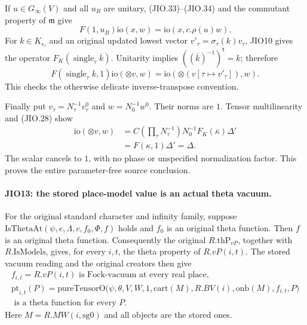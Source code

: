 If \(u\in G_\infty(V)\) and all \(u_B\) are unitary,
(JIO.33)--(JIO.34) and the commutant property of \(\mathfrak m\)
give
\[
                  F(1,u_B)\mathrm{io}(x,w)
                             =\mathrm{io}(x,c.\rho(u)w).
 \tag{JIO.36}
\]
For \(k\in K_{\epsilon_\tau}\) and an original updated lowest
vector \(v'_\tau=\sigma_\tau(k)v_\tau\), JIO10 gives the
operator \(F_K(\operatorname{single}_\tau\overline{k})\).
Unitarity implies
\(((\overline{k})^{-1})^{\mathsf t}=k\); therefore
\[
 F(\operatorname{single}_\tau k,1)\mathrm{io}(\otimes v,w)
                 =\mathrm{io}(\otimes(v[\tau\mapsto v'_\tau]),w).
 \tag{JIO.37}
\]
This checks the otherwise delicate inverse-transpose convention.

Finally put \(v_\tau=N_\tau^{-1}v^0_\tau\) and
\(w=N_0^{-1}w^0\).  Their norms are \(1\).
Tensor multilinearity and (JIO.28) show
\[
 \begin{split}
 \mathrm{io}(\otimes v,w)
   &=C\left(\prod_\tau N_\tau^{-1}\right)N_0^{-1}
                         F_K(\overline{\kappa})\Delta'\\
   &=F(\kappa,1)\Delta'=\Delta.
 \end{split}
 \tag{JIO.38}
\]
The scalar cancels to \(1\), with no phase or unspecified
normalization factor.  This proves the entire parameter-free
source conclusion.

\paragraph{JIO13: the stored place-model value is an actual theta vacuum.}
\label{claim:JIO13}
For the original standard character and infinity family, suppose
\(\mathrm{IsThetaAt}(\psi,e,\Lambda,c,f_0,\Phi,f)\) holds and
\(f_0\) is an original theta function.  Then \(f\) is an original
theta function.  Consequently the original
\(R.\mathrm{thP}_{vP}\), together with \(R.\mathrm{IsModels}\),
gives, for every \(i,t\), the theta property of \(R.vP(i,t)\).
The stored vacuum reading and the original creators then give
\[
 \begin{gathered}
 f_{i,t}=R.vP(i,t)\text{ is Fock-vacuum at every real place},\\
 \mathrm{pt}_{i,t}(P)=
 \mathrm{pureTensorO}\bigl(\psi,\theta,V,W,1,\mathrm{cart}(M),
                    R.BV(i),\mathrm{onb}(M),f_{i,t},P\bigr)\\
 \text{ is a theta function for every }P .
 \end{gathered}
 \tag{JIO.39}
\]
Here \(M=R.MW(i,\mathrm{sg0})\) and all objects are the stored ones.

